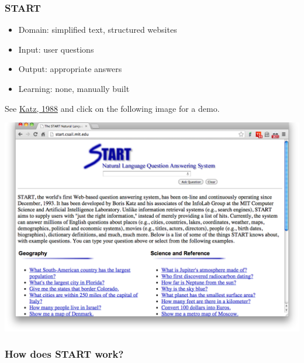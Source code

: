 \documentclass[ignorenonframetext]{beamer}
\begin{document}
\begin{frame}\frametitle{START}

\begin{itemize}
\item Domain: simplified text, structured websites
\item Input: user questions
\item Output: appropriate answers
\item Learning: none, manually built
\end{itemize}

See \href{ftp://publications.ai.mit.edu/ai-publications/pdf/AIM-1096.pdf}{Katz, 1988}
and click on the following image for a demo.

\begin{center}
\href{http://start.csail.mit.edu}{
\includegraphics[width=.7\textwidth]{katz-start.png}}
\end{center}

\end{frame}

\begin{frame}\frametitle{How does START work?}

\end{frame}
\end{document}
